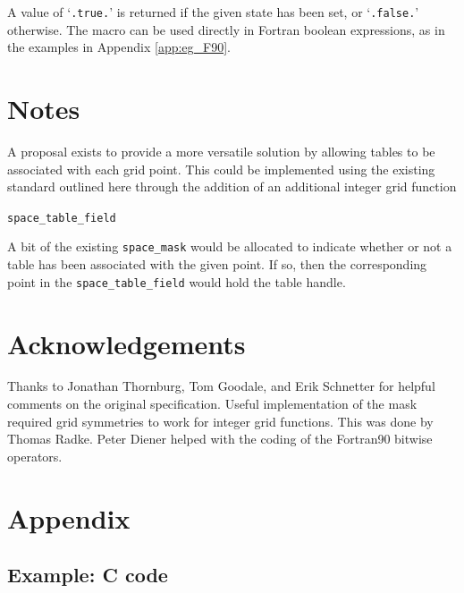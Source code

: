 \documentclass{article}
\begin{document}
\noindent A value of `\texttt{.true.}' is returned if the given state
has been set, or `\texttt{.false.}' otherwise. The macro can be used
directly in Fortran boolean expressions, as in the examples in
Appendix \ref{app:eg_F90}.


\section{Notes}

A proposal exists to provide a more versatile solution by allowing
tables to be associated with each grid point. This could be
implemented using the existing standard outlined here through the
addition of an additional integer grid function

\texttt{space\_table\_field}

A bit of the existing \texttt{space\_mask} would be allocated to
indicate whether or not a table has been associated with the given
point. If so, then the corresponding point in the
\texttt{space\_table\_field} would hold the table handle.


\section{Acknowledgements}

Thanks to Jonathan Thornburg, Tom Goodale, and Erik Schnetter for
helpful comments on the original specification. Useful implementation
of the mask required grid symmetries to work for integer grid
functions. This was done by Thomas Radke. Peter Diener helped with the
coding of the Fortran90 bitwise operators.

\section{Appendix}

\subsection{Example: C code}\label{app:eg_C}
\end{document}
